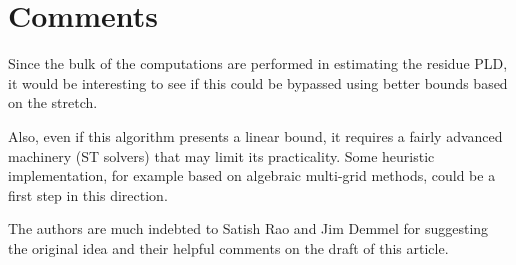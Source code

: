 
\section*{Comments}

Since the bulk of the computations are performed in estimating the
residue PLD, it would be interesting to see if this could be bypassed
using better bounds based on the stretch.

Also, even if this algorithm presents a linear bound, it requires
a fairly advanced machinery (ST solvers) that may limit its practicality.
Some heuristic implementation, for example based on algebraic multi-grid
methods, could be a first step in this direction.

The authors are much indebted to Satish Rao and Jim Demmel for suggesting
the original idea and their helpful comments on the draft of this
article. 
